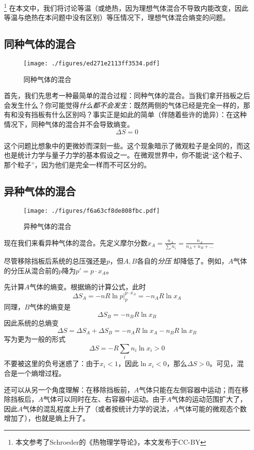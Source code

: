 

\footnote{本文参考了Schroeder的《热物理学导论》，本文发布于CC-BY} 在本文中，我们将讨论等温（或绝热，因为理想气体混合不导致内能改变，因此等温与绝热在本问题中没有区别）等压情况下，理想气体混合熵变的问题。

\subsection{同种气体的混合}
\begin{figure}[ht]
\centering
\texttt{[image: ./figures/ed271e2113ff3534.pdf]}
\caption{同种气体的混合} \label{fig_IGME_1}
\end{figure}
首先，我们先思考一种最简单的混合过程：同种气体的混合。当我们拿开挡板之后会发生什么？你可能觉得\textsl{什么都不会发生}：既然两侧的气体已经是完全一样的，那有和没有挡板有什么区别吗？事实正是如此的简单（伴随着些许的诡异）：在这种情况下，同种气体的混合并不会导致熵变。
\begin{equation}
\Delta S = 0
\end{equation}

这个问题比想象中的更微妙而深刻一些。这个现象暗示了微观粒子是全同的，而这也是统计力学与量子力学的基本假设之一。在微观世界中，你不能说“这个粒子、那个粒子”，因为他们是完全一样而不可区分的。

\subsection{异种气体的混合}
\begin{figure}[ht]
\centering
\texttt{[image: ./figures/f6a63cf8de808fbc.pdf]}
\caption{异种气体的混合} \label{fig_IGME_fig2}
\end{figure}

现在我们来看异种气体的混合。先定义摩尔分数$x_A = \frac{n_A}{\sum n_i} = \frac{n_A}{n_A+n_B+...}$

尽管移除挡板后系统的总压强还是$p$，但$A, B$各自的\textsl{分压} 却降低了。例如，$A$气体的分压从混合前的$p$降为$p'=p \cdot x_A$。

先计算$A$气体的熵变。根据熵的计算公式，此时
$$
\Delta S_A=-nR\ln p |^{p \cdot x_A}_p=-n_A R \ln x_A
$$
同理，$B$气体的熵变是
$$
\Delta S_B=-n_B R \ln x_B
$$
因此系统的总熵变
$$
\Delta S = \Delta S_A+\Delta S_B= -n_A R \ln x_A - n_B R \ln x_B
$$
写为更为一般的形式
\begin{equation}
\Delta S = -R \sum_i n_i \ln x_i >0
\end{equation}
不要被这里的负号迷惑了：由于$x_i<1$，因此$\ln x_i < 0$，那么$\Delta S>0$。可见，混合是一个熵增过程。

还可以从另一个角度理解：在移除挡板前，$A$气体只能在左侧容器中运动；而在移除挡板后，$A$气体可以同时在左、右容器中运动。由于$A$气体的运动范围扩大了，因此$A$气体的混乱程度上升了（或者按统计力学的说法，$A$气体可能的微观态个数增加了），也就是熵上升了。

